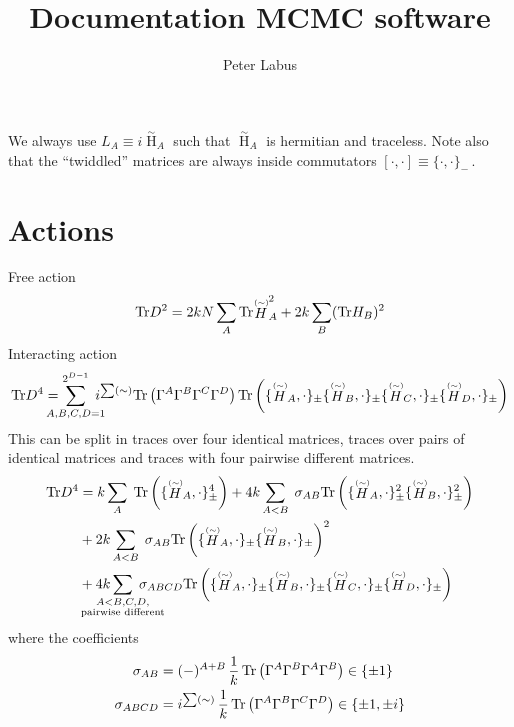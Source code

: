 \documentclass[10pt,a4paper]{article}
\author{Peter Labus}
\title{Documentation MCMC software}
\newcommand\ptwid[1]{\mathord{\mathop{#1}\limits^{\scriptscriptstyle(\sim)}}}
\newcommand\twid[1]{\mathord{\mathop{#1}\limits^{\scriptscriptstyle\sim}}}
\newcommand{\Tr}{\mathrm{Tr}\vspace{-2pt}}
\begin{document}
\maketitle

We always use $L_A \equiv i \twid H_A$ such that $\twid H_A$
is hermitian and traceless.
Note also that the ``twiddled'' matrices are always inside
commutators $[\cdot,\cdot] \equiv \{\cdot,\cdot\}_{-}\,$.

\section{Actions}

Free action
\begin{equation}
  \Tr D^2 = 2kN \sum_{A}  \Tr \ptwid H_A^2
  + 2k \sum_{B}  ( \Tr H_B )^2
\end{equation}
Interacting action
\begin{equation}
  \Tr D^4 = \sum_{\mathclap{A,B,C,D=1}}^{2^{D-1}} \; i^{\sum (\sim)}  \Tr \left(\Gamma^A \Gamma^B \Gamma^C \Gamma^D \right)
 \Tr \left( \{ \ptwid H_A, \cdot \}_{\pm}
 \{ \ptwid H_B, \cdot \}_{\pm}
 \{ \ptwid H_C, \cdot \}_{\pm}
 \{ \ptwid H_D, \cdot \}_{\pm} \right)
\end{equation}
This can be split in traces over four identical matrices, traces over
pairs of identical matrices and traces with
four pairwise different matrices.
\begin{align}
  \Tr D^4 &= k \sum_{A} \; \Tr \left( \{ \ptwid H_A, \cdot \}_{\pm}^4 \right) +
4k \sum_{A<B} \; \sigma_{AB}
\Tr \left( \{ \ptwid H_A, \cdot \}_{\pm}^2   \{ \ptwid H_B, \cdot \}_{\pm}^2 \right) \\
&+ 2k \sum_{A<B} \; \sigma_{AB}
\Tr \left( \{ \ptwid H_A, \cdot \}_{\pm}   \{ \ptwid H_B, \cdot \}_{\pm} \right)^2 \\
&+ 4k
\sum_{\mathclap{\substack{A<B,C,D,\\ \text{pairwise different}  }}} \;
\sigma_{ABCD}  \Tr \left( \{ \ptwid H_A, \cdot \}_{\pm}   \{ \ptwid H_B, \cdot \}_{\pm}
\{ \ptwid H_C, \cdot \}_{\pm}   \{ \ptwid H_D, \cdot \}_{\pm} \right)
\end{align}
where the coefficients
\begin{align}
\sigma_{AB} &=  (-)^{A+B} \, \frac{1}{k} \, \Tr \left(\Gamma^A \Gamma^B \Gamma^A \Gamma^B \right) \in \{\pm 1\}\\
  \sigma_{ABCD} &=  i^{\sum (\sim)} \, \frac{1}{k} \, \Tr \left(\Gamma^A \Gamma^B \Gamma^C \Gamma^D \right) \in \{\pm 1, \pm i\}
\end{align}
\end{document}
